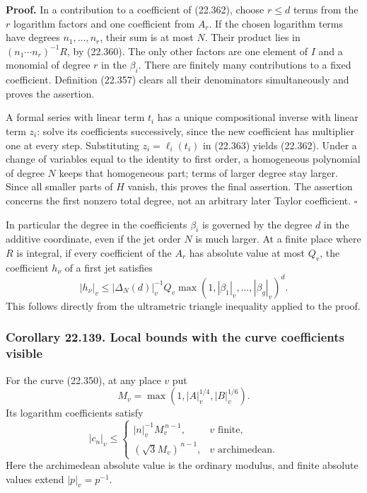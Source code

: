 \documentclass[
  11pt,
  a4paper,
]{article}
\begin{document}
\textbf{Proof.} In a contribution to a coefficient of (22.362), choose
\(r\le d\) terms from the \(r\) logarithm factors and one coefficient
from \(A_r\). If the chosen logarithm terms have degrees
\(n_1,\ldots,n_r\), their sum is at most \(N\). Their product lies in
\((n_1\cdots n_r)^{-1}R\), by (22.360). The only other factors are one
element of \(I\) and a monomial of degree \(r\) in the \(\beta_i\).
There are finitely many contributions to a fixed coefficient. Definition
(22.357) clears all their denominators simultaneously and proves the
assertion.

A formal series with linear term \(t_i\) has a unique compositional
inverse with linear term \(z_i\): solve its coefficients successively,
since the new coefficient has multiplier one at every step. Substituting
\(z_i=\ell_i(t_i)\) in (22.363) yields (22.362). Under a change of
variables equal to the identity to first order, a homogeneous polynomial
of degree \(N\) keeps that homogeneous part; terms of larger degree stay
larger. Since all smaller parts of \(H\) vanish, this proves the final
assertion. The assertion concerns the first nonzero total degree, not an
arbitrary later Taylor coefficient. \(\square\)

In particular the degree in the coefficients \(\beta_i\) is governed by
the degree \(d\) in the additive coordinate, even if the jet order \(N\)
is much larger. At a finite place where \(R\) is integral, if every
coefficient of the \(A_r\) has absolute value at most \(Q_v\), the
coefficient \(h_\nu\) of a first jet satisfies \[
 |h_\nu|_v\le
 |\Delta_N(d)|_v^{-1} Q_v
           \max(1,|\beta_1|_v,\ldots,|\beta_g|_v)^d.
 \tag{22.364}
\] This follows directly from the ultrametric triangle inequality
applied to the proof.

\subsubsection{Corollary 22.139. Local bounds with the curve
coefficients
visible}\label{corollary-22.139.-local-bounds-with-the-curve-coefficients-visible}

For the curve (22.350), at any place \(v\) put \[
 M_v=\max(1,|A|_v^{1/4},|B|_v^{1/6}).
 \tag{22.365}
\] Its logarithm coefficients satisfy \[
 |c_n|_v\le
 \begin{cases}
 |n|_v^{-1}M_v^{\,n-1},&v\text{ finite},\\
 (\sqrt3 M_v)^{\,n-1},&v\text{ archimedean}.
 \end{cases}
 \tag{22.366}
\] Here the archimedean absolute value is the ordinary modulus, and
finite absolute values extend \(|p|_v=p^{-1}\).
\end{document}
